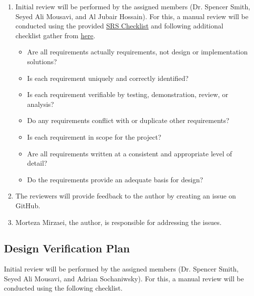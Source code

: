 \documentclass[12pt, titlepage]{article}
\begin{document}
\begin{enumerate}
\item Initial review will be performed by the assigned members
      (Dr. Spencer Smith, Seyed Ali Mousavi, and Al Jubair Hossain).
      For this, a manual review will be conducted using the provided 
      \href{https://github.com/mirzaim/ipcs/blob/main/docs/Checklists/SRS-Checklist.pdf}{SRS Checklist} 
      and following additional checklist gather from 
      \href{https://www.cs.toronto.edu/~sme/CSC340F/2005/assignments/inspections/reqts_checklist.pdf}{here}.
      \begin{itemize}\renewcommand{\labelitemi}{\scriptsize$\square$}
        \item Are all requirements actually requirements, not design or implementation solutions?
        \item Is each requirement uniquely and correctly identified?
        \item Is each requirement verifiable by testing, demonstration, review, or analysis?
        \item Do any requirements conflict with or duplicate other requirements?
        \item Is each requirement in scope for the project?
        \item Are all requirements written at a consistent and appropriate level of detail?
        \item Do the requirements provide an adequate basis for design?
      \end{itemize}
\item The reviewers will provide feedback to the author by creating an issue on GitHub.
\item Morteza Mirzaei, the author, is responsible for addressing the issues.
\end{enumerate}




\subsection{Design Verification Plan} \label{sebsec_design_verification_plan}

Initial review will be performed by the assigned members 
(Dr. Spencer Smith, Seyed Ali Mousavi, and Adrian Sochaniwsky). 
For this, a manual review will be conducted using the following checklist.
\end{document}
